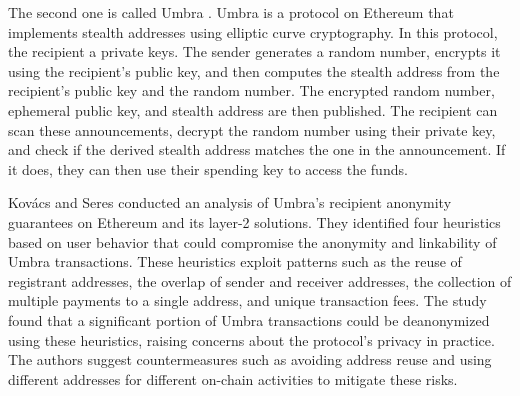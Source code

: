 The second one is called Umbra \cite{umbra}. Umbra is a protocol on Ethereum
that implements stealth addresses using elliptic curve cryptography. In this
protocol, the recipient a private keys. The sender generates a random number,
encrypts it using the recipient's public key, and then
computes the stealth address from the recipient's public key and the random
number. The encrypted random number, ephemeral public key, and stealth address
are then published. The recipient can scan these announcements, decrypt the
random number using their private key, and check if the derived stealth
address matches the one in the announcement. If it does, they can then use
their spending key to access the funds.

Kovács and Seres \cite{Kovacs2023} conducted an analysis of Umbra's recipient
anonymity guarantees on Ethereum and its layer-2 solutions. They identified four
heuristics based on user behavior that could compromise the anonymity and
linkability of Umbra transactions. These heuristics exploit patterns such as
the reuse of registrant addresses, the overlap of sender and receiver
addresses, the collection of multiple payments to a single address, and unique
transaction fees. The study found that a significant portion of Umbra
transactions could be deanonymized using these heuristics, raising concerns
about the protocol's privacy in practice. The authors suggest countermeasures
such as avoiding address reuse and using different addresses for different
on-chain activities to mitigate these risks.

